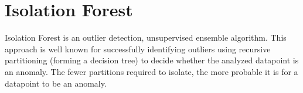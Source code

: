 \section{Isolation Forest}
\label{sec:isolation_forest}

Isolation Forest
\cite{liu2008isolation} \cite{liu2012isolation} is an outlier
detection, unsupervised ensemble algorithm. This approach is well known for successfully identifying outliers using recursive partitioning (forming a decision tree) to decide whether the analyzed datapoint is an anomaly. The fewer partitions required to isolate, the more probable it is for a datapoint to be an anomaly.








